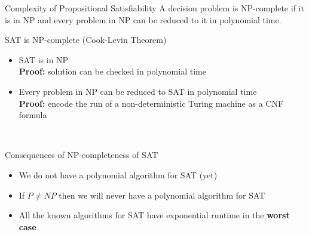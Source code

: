 \documentclass[t]{sdqbeamer}
\begin{document}
\begin{frame}{Complexity of Propositional Satisfiability}
\vspace*{-1em}
A decision problem is NP-complete if it is in NP and every problem in NP can be reduced to it in polynomial time.
\begin{block}{SAT is NP-complete (Cook-Levin Theorem)}
\begin{itemize}\itemsep1ex
	\item SAT is in NP\\
	\textbf{Proof:} solution can be checked in polynomial time
	\item Every problem in NP can be reduced to SAT in polynomial time\\
	\textbf{Proof:} encode the run of a non-deterministic Turing machine as a CNF formula
\end{itemize}
\end{block}~\\
\pause
\begin{block}{Consequences of NP-completeness of SAT}
\begin{itemize}\itemsep1ex
	\item<2-> We do not have a polynomial algorithm for SAT (yet) ~
	\item<3-> If $P \neq NP$ then we will never have a polynomial algorithm for SAT ~
	\item<4-> All the known algorithms for SAT have exponential runtime in the \textbf{worst case} ~
\end{itemize}
\end{block}~\\
\end{frame}
\end{document}
